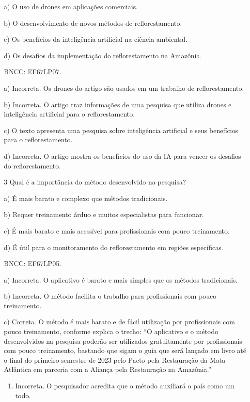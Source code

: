a) O uso de drones em aplicações comerciais.

b) O desenvolvimento de novos métodos de reflorestamento.

c) Os benefícios da inteligência artificial na ciência ambiental.

d) Os desafios da implementação do reflorestamento na Amazônia.

BNCC: EF67LP07.

a) Incorreta. Os drones do artigo são usados em um trabalho de
reflorestamento.

b) Incorreta. O artigo traz informações de uma pesquisa que utiliza
drones e inteligência artificial para o reflorestamento.

c) O texto apresenta uma pesquisa sobre inteligência artificial e seus
benefícios para o reflorestamento.

d) Incorreta. O artigo mostra os benefícios do uso da IA para vencer os
desafios do reflorestamento.

\num{3} Qual é a importância do método desenvolvido na pesquisa?

a) É mais barato e complexo que métodos tradicionais.

b) Requer treinamento árduo e muitos especialistas para funcionar.

c) É mais barato e mais acessível para profissionais com pouco
treinamento.

d) É útil para o monitoramento do reflorestamento em regiões
específicas.

BNCC: EF67LP05.

a) Incorreta. O aplicativo é barato e mais simples que os métodos
tradicionais.

b) Incorreta. O método facilita o trabalho para profissionais com pouco
treinamento.

c) Correta. O método é mais barato e de fácil utilização por
profissionais com pouco treinamento, conforme explica o trecho: ``O
aplicativo e o método desenvolvidos na pesquisa poderão ser utilizados
gratuitamente por profissionais com pouco treinamento, bastando que
sigam o guia que será lançado em livro até o final do primeiro semestre
de 2023 pelo Pacto pela Restauração da Mata Atlântica em parceria com a
Aliança pela Restauração na Amazônia.''

\begin{enumerate}
\def\labelenumi{\alph{enumi})}
\setcounter{enumi}{3}
\tightlist
\item
  Incorreta. O pesquisador acredita que o método auxiliará o país como
  um todo.
\end{enumerate}

